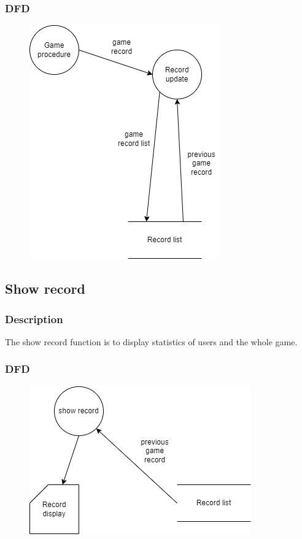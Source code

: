 \documentclass{article}
\begin{document}
\subsubsection{DFD}
\begin{figure}[H]
    \centering
    \includegraphics*[scale=0.4]{Record_update_DFD.png}
\end{figure}
\subsection{Show record}
\subsubsection{Description}
\par The show record function is to display statistics of users and the whole game.
\subsubsection{DFD}
\begin{figure}[H]
    \centering
    \includegraphics*[scale=0.4]{Show_record_DFD.png}
\end{figure}
\end{document}
